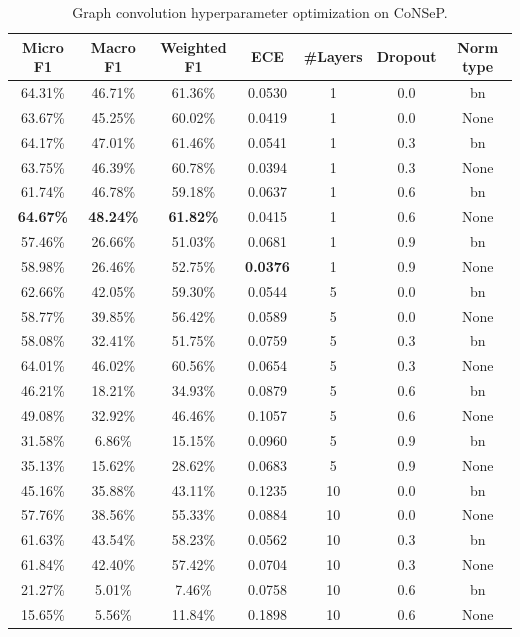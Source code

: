 \begin{table}[ht]
    \centering
    \caption{Graph convolution hyperparameter optimization on CoNSeP.}
\begin{tabular}{|c|c|c|c|c|c|c|}
\hline
Micro F1 & Macro F1 & Weighted F1 & ECE & \#Layers & Dropout & Norm type\\ \hline
64.31\% & 46.71\% & 61.36\% & 0.0530 & 1 & 0.0 & bn\\ \hline
63.67\% & 45.25\% & 60.02\% & 0.0419 & 1 & 0.0 & None\\ \hline
64.17\% & 47.01\% & 61.46\% & 0.0541 & 1 & 0.3 & bn\\ \hline
63.75\% & 46.39\% & 60.78\% & 0.0394 & 1 & 0.3 & None\\ \hline
61.74\% & 46.78\% & 59.18\% & 0.0637 & 1 & 0.6 & bn\\ \hline
\textbf{64.67\%} & \textbf{48.24\%} & \textbf{61.82\%} & 0.0415 & 1 & 0.6 & None\\ \hline
57.46\% & 26.66\% & 51.03\% & 0.0681 & 1 & 0.9 & bn\\ \hline
58.98\% & 26.46\% & 52.75\% & \textbf{0.0376} & 1 & 0.9 & None\\ \hline
62.66\% & 42.05\% & 59.30\% & 0.0544 & 5 & 0.0 & bn\\ \hline
58.77\% & 39.85\% & 56.42\% & 0.0589 & 5 & 0.0 & None\\ \hline
58.08\% & 32.41\% & 51.75\% & 0.0759 & 5 & 0.3 & bn\\ \hline
64.01\% & 46.02\% & 60.56\% & 0.0654 & 5 & 0.3 & None\\ \hline
46.21\% & 18.21\% & 34.93\% & 0.0879 & 5 & 0.6 & bn\\ \hline
49.08\% & 32.92\% & 46.46\% & 0.1057 & 5 & 0.6 & None\\ \hline
31.58\% & 6.86\% & 15.15\% & 0.0960 & 5 & 0.9 & bn\\ \hline
35.13\% & 15.62\% & 28.62\% & 0.0683 & 5 & 0.9 & None\\ \hline
45.16\% & 35.88\% & 43.11\% & 0.1235 & 10 & 0.0 & bn\\ \hline
57.76\% & 38.56\% & 55.33\% & 0.0884 & 10 & 0.0 & None\\ \hline
61.63\% & 43.54\% & 58.23\% & 0.0562 & 10 & 0.3 & bn\\ \hline
61.84\% & 42.40\% & 57.42\% & 0.0704 & 10 & 0.3 & None\\ \hline
21.27\% & 5.01\% & 7.46\% & 0.0758 & 10 & 0.6 & bn\\ \hline
15.65\% & 5.56\% & 11.84\% & 0.1898 & 10 & 0.6 & None\\ \hline

\end{tabular}
\end{table}
